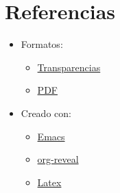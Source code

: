 \documentclass{article}
\begin{document}






\section{Referencias}
\label{sec:orgbda1485}
\begin{itemize}
\item Formatos:
\begin{itemize}
\item \href{par-03-capa-de-enlace.html}{Transparencias}
\item \href{par-03-capa-de-enlace.pdf}{PDF}
\end{itemize}
\item Creado con:
\begin{itemize}
\item \href{https://www.gnu.org/s/emacs/}{Emacs}
\item \href{https://github.com/yjwen/org-reveal}{org-reveal}
\item \href{https://www.latex-project.org/}{Latex}
\end{itemize}
\end{itemize}
\end{document}
